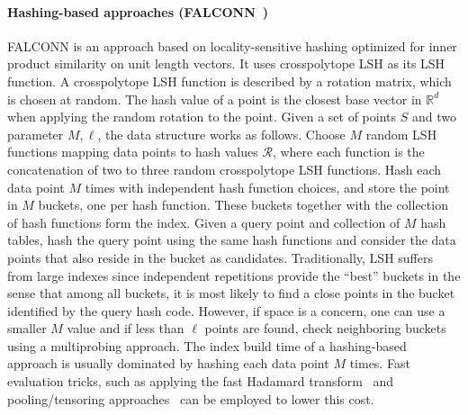 \documentclass[11pt]{article}
\begin{document}
\paragraph{Hashing-based approaches
	(FALCONN~\cite{DBLP:conf/nips/AndoniILRS15})} FALCONN is an approach based
on locality-sensitive hashing optimized for inner product similarity on
unit length vectors.
It uses crosspolytope LSH as its LSH function.
A crosspolytope LSH function is described by a rotation matrix, which is chosen at random.
The hash value of a point is the closest base vector in $\mathbb{R}^d$ when applying the random rotation to the point.
Given a set of points $S$ and two parameter $M, \ell$,
the data structure works as follows.
Choose $M$ random LSH
functions mapping data points to hash values $\mathcal{R}$, where each function is the concatenation of two to three random crosspolytope LSH functions.
Hash each data
point $M$ times with independent hash function choices, and store the point in $M$ buckets, one per hash function.
These buckets together with the collection of hash functions form the index.
Given a query point and collection of $M$ hash tables, hash the query point
using the same hash functions and consider the data points that also reside
in the bucket as candidates.
Traditionally, LSH suffers from large indexes since independent repetitions provide the ``best'' buckets in the sense that among all buckets, it is most likely to find a close points in the bucket identified by the query hash code.
However, if space is a concern, one can use a smaller $M$ value and
if less than $\ell$ points are found, check
neighboring buckets using a multiprobing approach.
The index build time of a hashing-based approach is usually dominated by hashing each data point $M$ times.
Fast evaluation tricks, such as applying the fast Hadamard transform~\cite{DBLP:conf/nips/AndoniILRS15} and pooling/tensoring approaches~\cite{DBLP:conf/sisap/Christiani19} can be employed to lower this cost.
\end{document}
